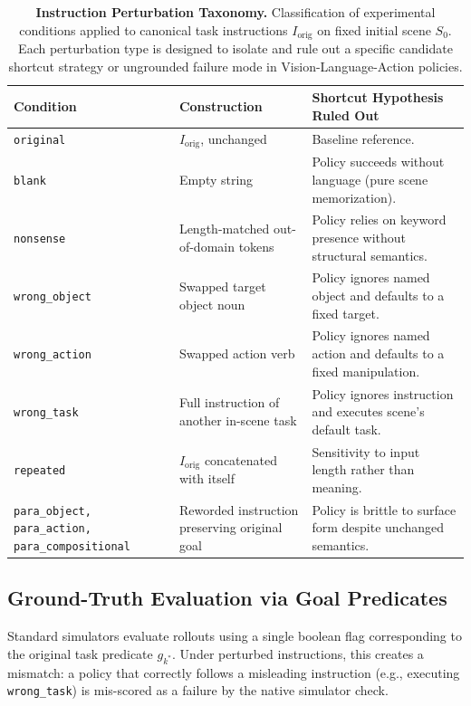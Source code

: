 \documentclass[11pt]{article}
\begin{document}
\begin{table}[t]
    \centering
    \small
    \renewcommand{\arraystretch}{1.15}
    \begin{tabular}{@{}p{3.7cm}p{5.5cm}p{5.9cm}@{}}
        \hline
        \textbf{Condition} & \textbf{Construction} & \textbf{Shortcut Hypothesis Ruled Out} \\
        \hline
        \texttt{original} & $I_{\text{orig}}$, unchanged & Baseline reference. \\
        \texttt{blank} & Empty string & Policy succeeds without language (pure scene memorization). \\
        \texttt{nonsense} & Length-matched out-of-domain tokens & Policy relies on keyword presence without structural semantics. \\
        \texttt{wrong\_object} & Swapped target object noun & Policy ignores named object and defaults to a fixed target. \\
        \texttt{wrong\_action} & Swapped action verb & Policy ignores named action and defaults to a fixed manipulation. \\
        \texttt{wrong\_task} & Full instruction of another in-scene task & Policy ignores instruction and executes scene's default task. \\
        \texttt{repeated} & $I_{\text{orig}}$ concatenated with itself & Sensitivity to input length rather than meaning. \\
        \texttt{para\_object, para\_action,} \texttt{para\_compositional} & Reworded instruction preserving original goal & Policy is brittle to surface form despite unchanged semantics. \\
        \hline
\end{tabular}
\caption{\textbf{Instruction Perturbation Taxonomy.} Classification of experimental conditions applied to canonical task instructions $I_{\text{orig}}$ on fixed initial scene $S_0$. Each perturbation type is designed to isolate and rule out a specific candidate shortcut strategy or ungrounded failure mode in Vision-Language-Action policies.}
\label{tab:taxonomy}
\end{table}

\subsection{Ground-Truth Evaluation via Goal Predicates}
\label{subsec:goal-predicates}

Standard simulators evaluate rollouts using a single boolean flag corresponding to the original task predicate $g_{k^*}$. Under perturbed instructions, this creates a mismatch: a policy that correctly follows a misleading instruction (e.g., executing \texttt{wrong\_task}) is mis-scored as a failure by the native simulator check.
\end{document}
